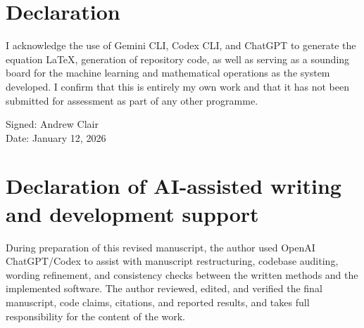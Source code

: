 \documentclass[12pt]{article}
\begin{document}
\newpage

\section*{Declaration}
I acknowledge the use of Gemini CLI, Codex CLI, and ChatGPT to generate the equation LaTeX, generation of repository code, as well as serving as a sounding board for the machine learning and mathematical operations as the system developed. I confirm that this is entirely my own work and that it has not been submitted for assessment as part of any other programme.

\vspace{1cm}
Signed: Andrew Clair \\
Date: January 12, 2026

\newpage






\newpage

\section*{Declaration of AI-assisted writing and development support}

During preparation of this revised manuscript, the author used OpenAI ChatGPT/Codex to assist with manuscript restructuring, codebase auditing, wording refinement, and consistency checks between the written methods and the implemented software. The author reviewed, edited, and verified the final manuscript, code claims, citations, and reported results, and takes full responsibility for the content of the work.
\end{document}
